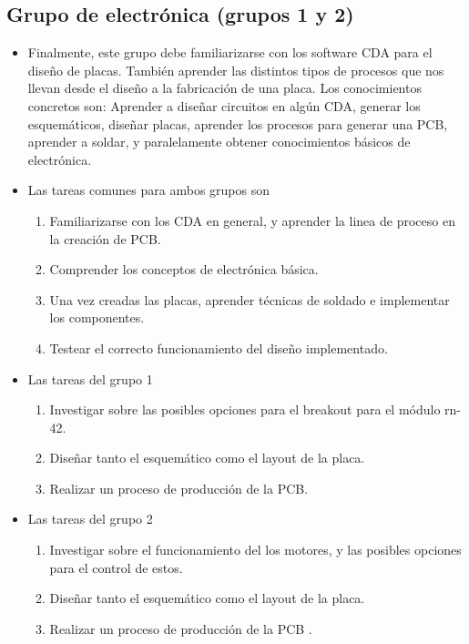 \documentclass[11pt,letterpaper,spanish]{article}
\begin{document}
\subsection{Grupo de electrónica (grupos 1 y 2)}
\begin{itemize}
\item Finalmente, este grupo debe familiarizarse con los software CDA para el diseño de placas. También aprender las distintos tipos de procesos que nos llevan desde el diseño a la fabricación de una placa. Los conocimientos concretos son: Aprender a diseñar circuitos en algún CDA, generar los esquemáticos, diseñar placas, aprender los procesos para generar una PCB, aprender a soldar, y paralelamente obtener conocimientos básicos de electrónica.
\item Las tareas comunes para ambos grupos son
\begin{enumerate}
\item Familiarizarse con los CDA en general, y aprender la linea de proceso en la creación de PCB.
\item Comprender los conceptos de electrónica básica.
\item Una vez creadas las placas, aprender técnicas de soldado e implementar los componentes.
\item Testear el correcto funcionamiento del diseño implementado.
\end{enumerate}
		
\item Las tareas del grupo 1
\begin{enumerate}
\item Investigar sobre las posibles opciones para el breakout para el módulo rn-42.
\item Diseñar tanto el esquemático como el layout de la placa.
\item Realizar un proceso de producción de la PCB.
\end{enumerate}		

\item Las tareas del grupo 2
\begin{enumerate}
\item Investigar sobre el funcionamiento del los motores, y las posibles opciones para el control de estos.
\item Diseñar tanto el esquemático como el layout de la placa.
\item  Realizar un proceso de producción de la PCB .
\end{enumerate} 
\end{itemize}
\end{document}

